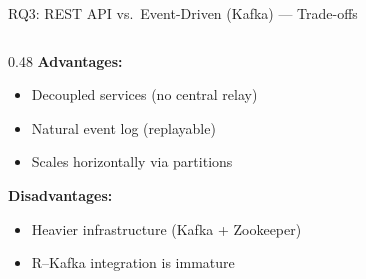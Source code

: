 \documentclass[aspectratio=169]{beamer}
\begin{document}
\begin{frame}{RQ3: REST API vs.\ Event-Driven (Kafka) --- Trade-offs}
\begin{columns}[T]
\begin{column}{0.48\textwidth}
\vspace{0.5em}
\textbf{Advantages:}
\begin{itemize}
    \item[\textcolor{green!60!black}{\faCheck}] Decoupled services (no central relay)
    \item[\textcolor{green!60!black}{\faCheck}] Natural event log (replayable)
    \item[\textcolor{green!60!black}{\faCheck}] Scales horizontally via partitions
\end{itemize}

\textbf{Disadvantages:}
\begin{itemize}
    \item[\textcolor{red}{\faTimes}] Heavier infrastructure (Kafka + Zookeeper)
    \item[\textcolor{red}{\faTimes}] R--Kafka integration is immature
\end{itemize}

\end{column}
\end{columns}

\end{frame}
\end{document}
